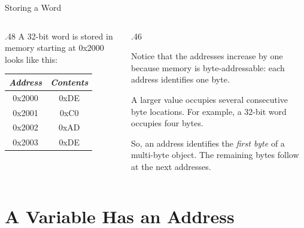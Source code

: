 \documentclass[9pt,aspectratio=169,xcolor=table]{beamer}
\begin{document}
\begin{frame}{Storing a Word}
	\leavevmode

	\begin{columns}[c]
		\begin{column}{.48\textwidth}
			{\small
				A 32-bit word is stored in memory starting at 0x2000 looks like this:			}

			\vspace{2mm}
			\begin{center}

				\begin{tabular}{|c|c|}
					\hline
					\textit{Address} & \textit{Contents} \\
					\hline
					0x2000 & 0xDE \\
					\hline
					0x2001 & 0xC0 \\
					\hline
					0x2002 & 0xAD \\
					\hline
					0x2003 & 0xDE \\
					\hline
				\end{tabular}

			\end{center}
		\end{column}

		\begin{column}{.46\textwidth}
			{\small
				Notice that the addresses increase by one because memory is
				\alert{byte-addressable}: each address identifies one byte.

				\vspace{3mm}

				A larger value occupies several consecutive byte locations.
				For example, a 32-bit word occupies four bytes.

				\vspace{3mm}

				So, an address identifies the \emph{first byte} of a
				multi-byte object. The remaining bytes follow at the
				next addresses.
			}
		\end{column}
	\end{columns}
\end{frame}


\section{A Variable Has an Address}
\end{document}
